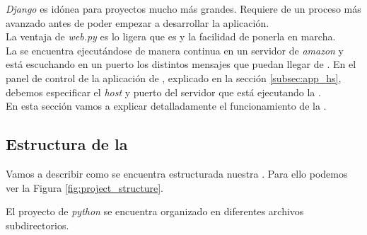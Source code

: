 \textit{Django} es idónea para proyectos mucho más grandes. Requiere de un proceso más avanzado antes de poder empezar a desarrollar la aplicación.\\

La ventaja de \textit{web.py} es lo ligera que es y la facilidad de ponerla en marcha.\\

La \iface{} se encuentra ejecutándose de manera continua en un servidor de \textit{amazon} y está escuchando en un puerto los distintos mensajes que puedan llegar de \hs{}.
En el panel de control de la aplicación de \hs{}, explicado en la sección \ref{subsec:app_hs}, debemos especificar el \textit{host} y puerto del servidor que está ejecutando la \iface{}.\\


En esta sección vamos a explicar detalladamente el funcionamiento de la \iface{}.

\subsection{Estructura de la \iface{}}
Vamos a describir como se encuentra estructurada nuestra \iface. Para ello podemos ver la Figura \ref{fig:project_structure}. 

El proyecto de \textit{python} se encuentra organizado en diferentes archivos subdirectorios.

